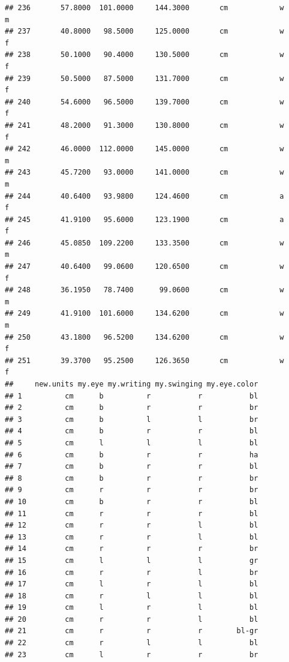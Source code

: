 \documentclass[]{article}
\begin{document}
\begin{verbatim}
## 236       57.8000  101.0000     144.3000       cm            w         m
## 237       40.8000   98.5000     125.0000       cm            w         f
## 238       50.1000   90.4000     130.5000       cm            w         f
## 239       50.5000   87.5000     131.7000       cm            w         f
## 240       54.6000   96.5000     139.7000       cm            w         f
## 241       48.2000   91.3000     130.8000       cm            w         f
## 242       46.0000  112.0000     145.0000       cm            w         m
## 243       45.7200   93.0000     141.0000       cm            w         m
## 244       40.6400   93.9800     124.4600       cm            a         f
## 245       41.9100   95.6000     123.1900       cm            a         f
## 246       45.0850  109.2200     133.3500       cm            w         m
## 247       40.6400   99.0600     120.6500       cm            w         f
## 248       36.1950   78.7400      99.0600       cm            w         m
## 249       41.9100  101.6000     134.6200       cm            w         m
## 250       43.1800   96.5200     134.6200       cm            w         f
## 251       39.3700   95.2500     126.3650       cm            w         f
##     new.units my.eye my.writing my.swinging my.eye.color
## 1          cm      b          r           r           bl
## 2          cm      b          r           r           br
## 3          cm      b          l           l           br
## 4          cm      b          r           r           bl
## 5          cm      l          l           l           bl
## 6          cm      b          r           r           ha
## 7          cm      b          r           r           bl
## 8          cm      b          r           r           br
## 9          cm      r          r           r           br
## 10         cm      b          r           r           bl
## 11         cm      r          r           r           bl
## 12         cm      r          r           l           bl
## 13         cm      r          r           l           bl
## 14         cm      r          r           r           br
## 15         cm      l          l           l           gr
## 16         cm      r          r           l           br
## 17         cm      l          r           l           bl
## 18         cm      r          l           l           bl
## 19         cm      l          r           l           bl
## 20         cm      r          r           l           bl
## 21         cm      r          r           r        bl-gr
## 22         cm      r          l           l           bl
## 23         cm      l          r           r           br

\end{verbatim}
\end{document}
